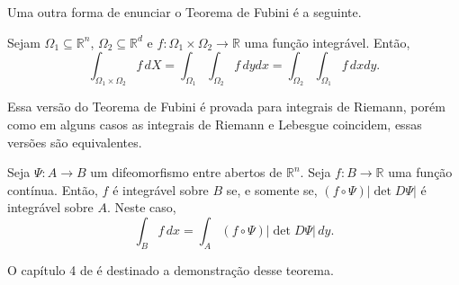 \documentclass[a4paper, 11pt]{book}
\theoremstyle{definition}
\newcommand{\bR}{\mathbb{R}}
\begin{document}
Uma outra forma de enunciar o Teorema de Fubini é a seguinte.
\begin{tbox}
    Sejam $\Omega_1 \subseteq \bR^n$, $\Omega_2  \subseteq \bR^d$ e $f : \Omega_1 \times \Omega_2 \to \bR$ uma função integrável.
Então,
\[
    \int_{\Omega_1 \times \Omega_2} f \,dX = \int_{\Omega_1} \int_{\Omega_2} f \, dydx = \int_{\Omega_2} \int_{\Omega_1} f \,dxdy.
\]
\end{tbox}

Essa versão do Teorema de Fubini é provada para integrais de Riemann, porém como em alguns casos as integrais de Riemann e Lebesgue coincidem, essas versões são equivalentes.


\begin{tbox} \label{thm:mudanca-de-variaveis}
    Seja $\Psi : A \to B$ um difeomorfismo entre abertos de $\bR^n$. Seja $f : B \to \bR$ uma função contínua. Então, $f$ é integrável sobre $B$ se, e somente se, $(f \circ \Psi) |\det D\Psi|$ é integrável sobre $A$. Neste caso,
    \[
        \int_B f \,dx = \int_A (f \circ \Psi) |\det D\Psi| \,dy.
    \]
\end{tbox}
\begin{prf}
    O capítulo 4 de \cite{munkres-analysis.on.manifolds} é destinado a demonstração desse teorema.
\end{prf}
\end{document}
